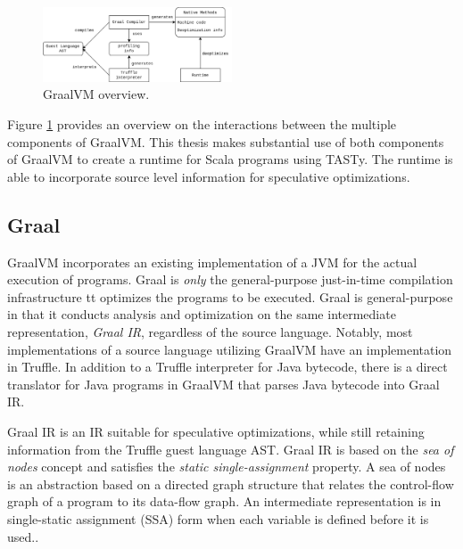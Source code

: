 \begin{figure}[!htb]
	\centering
	\includegraphics[width=0.5\textwidth]{figures/graalvm-pipeline.png}
	\caption{GraalVM overview\cite{graalvm:ir}.}
	\label{figure:graalvm-overview}
\end{figure}

Figure \ref{figure:graalvm-overview} provides an overview on the interactions between the multiple components of GraalVM.
This thesis makes substantial use of both components of GraalVM to create a runtime for Scala programs using TASTy.
The runtime is able to incorporate source level information for speculative optimizations.

\subsection{Graal}

GraalVM incorporates an existing implementation of a JVM\cite{java:hotspot} for the actual execution of programs.
Graal is \textit{only} the general-purpose just-in-time compilation infrastructure tt optimizes the programs to be executed.
Graal is general-purpose in that it conducts analysis and optimization on the same intermediate representation, \textit{Graal IR}, regardless of the source language.
Notably, most implementations of a source language utilizing GraalVM have an implementation in Truffle.
In addition to a Truffle interpreter for Java bytecode\cite{graalvm:espresso}, there is a direct translator for Java programs in GraalVM that parses Java bytecode into Graal IR.

Graal IR\cite{graalvm:ir} is an IR suitable for speculative optimizations, while still retaining information from the Truffle guest language AST.
Graal IR is based on the \textit{sea of nodes} concept\cite{click:sea-of-nodes} and satisfies the \textit{static single-assignment}\cite{ssa} property.
A sea of nodes is an abstraction based on a directed graph structure that relates the control-flow graph\cite{allen:ctrl-flow-analysis} of a program to its data-flow graph\cite{allen:data-flow-analysis}.
An intermediate representation is in single-static assignment (SSA) form when each variable is defined before it is used.\cite{johnson:use-def-chains}.

